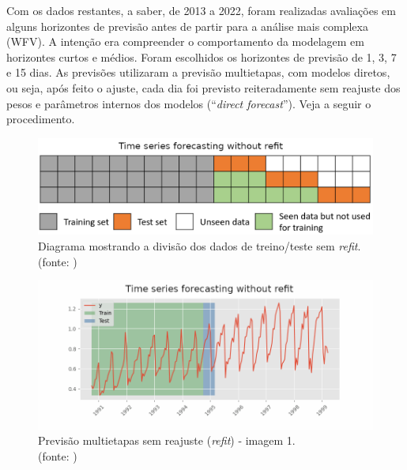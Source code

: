 Com os dados restantes, a saber, de 2013 a 2022, foram realizadas avaliações em alguns horizontes de previsão antes de partir para a análise mais complexa (WFV). A intenção era compreender o comportamento da modelagem em horizontes curtos e médios. Foram escolhidos os horizontes de previsão de 1, 3, 7 e 15 dias. As previsões utilizaram a previsão multietapas, com modelos diretos, ou seja, após feito o ajuste, cada dia foi previsto reiteradamente sem reajuste dos pesos e parâmetros internos dos modelos (``\textit{direct forecast}''). Veja a seguir o procedimento.

\begin{figure}[!h]
	\centering
	\includegraphics[scale=0.3]{Figuras/skforecast-diagram-backtesting-no-refit.png}
	\caption{Diagrama mostrando a divisão dos dados de treino/teste sem \textit{refit}.\\(fonte: \cite{skforecast})}
	\label{fig:skforecast-diagram-backtesting-no-refit}
\end{figure}

\begin{figure}[!h]
	\centering
	\includegraphics[scale=0.3]{Figuras/imagem1_skforecast-backtesting-no-refit.png}
	\caption{Previsão multietapas sem reajuste (\textit{refit}) - imagem 1.\\(fonte: \cite{skforecast})}
	\label{fig:imagem1_skforecast-backtesting-no-refit}
\end{figure}

